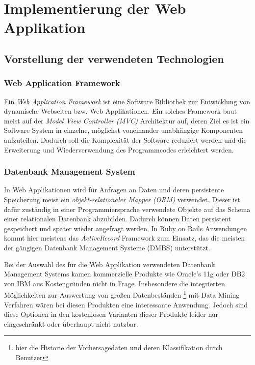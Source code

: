 \chapter{Implementierung der Web Applikation}

\section{Vorstellung der verwendeten Technologien}

\subsection{Web Application Framework}

Ein \textit{Web Application Framework} ist eine Software Bibliothek
zur Entwicklung von dynamische Webseiten bzw. Web Applikationen. Ein
solches Framework baut meist auf der \textit{Model View Controller
  (MVC)} Architektur auf, deren Ziel es ist ein Software System in
einzelne, möglichst voneinander unabhängige Komponenten
aufzuteilen. Dadurch soll die Komplexität der Software reduziert
werden und die Erweiterung und Wiederverwendung des Programmcodes
erleichtert werden.

\subsection{Datenbank Management System}

In Web Applikationen wird für Anfragen an Daten und deren persistente
Speicherung meist ein \textit{objekt-relationaler Mapper (ORM)}
verwendet. Dieser ist dafür zuständig in einer Programmiersprache
verwendete Objekte auf das Schema einer relationalen Datenbank
abzubilden. Dadurch können Daten persistent gespeichert und später
wieder angefragt werden. In Ruby on Rails Anwendungen kommt hier
meistens das \textit{ActiveRecord} Framework zum Einsatz, das die
meisten der gängigen Datenbank Management Systeme (DMBS) unterstützt.

Bei der Auswahl des für die Web Applikation verwendeten Datenbank
Management Systems kamen kommerzielle Produkte wie Oracle's 11g oder
DB2 von IBM aus Kostengründen nicht in Frage. Insbesondere die
integrierten Möglichkeiten zur Auswertung von großen Datenbeständen
\footnote{hier die Historie der Vorhersagedaten und deren
  Klassifikation durch Benutzer} mit Data Mining Verfahren wären bei
diesen Produkten eine interessante Anwendung. Jedoch sind diese
Optionen in den kostenlosen Varianten dieser Produkte leider nur
eingeschränkt oder überhaupt nicht nutzbar.

